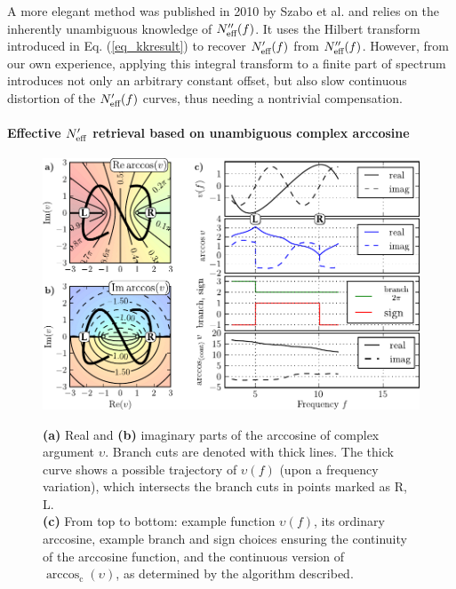 A more elegant method was published in 2010 by Szabo et al. \cite{szabo2010unique} and relies on the inherently unambiguous knowledge of $N_{\text{eff} }''(f)$. It uses the Hilbert transform introduced in Eq. (\ref{eq_kkresult}) to recover $N_{\text{eff} }'(f)$ from $N_{\text{eff} }''(f)$. 
However, from our own experience, applying this integral transform to a finite part of spectrum introduces not only an arbitrary constant offset, but also slow continuous distortion of the $N_{\text{eff} }'(f)$ curves, thus needing a nontrivial compensation.

\paragraph{Effective $N_{\text{eff} }'$ retrieval based on unambiguous complex arccosine}
\begin{figure} \centering \caption{\textbf{(a)} Real and \textbf{(b)} imaginary parts of the arccosine of complex argument $\upsilon$. Branch cuts are denoted with thick lines. The thick curve shows a possible trajectory of  $\upsilon(f)$ (upon a frequency variation), which intersects the branch cuts in points marked as R, L.\\ \textbf{(c)} From top to bottom: example function  $\upsilon(f)$, its ordinary arccosine, example branch and sign choices ensuring the continuity of the arccosine function, and the continuous version of $\arccos_{\mathrm{c}}(\upsilon)$, as determined by the algorithm described.} \includegraphics[width=16cm]{img/continuous_arccos/continuous_arccos_new.pdf} \label{fg_arccos}
\end{figure}


